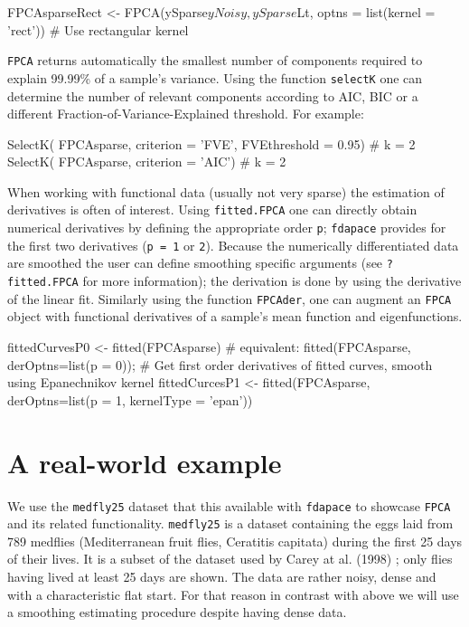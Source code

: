 \documentclass[11pt,english]{article}\usepackage[]{graphicx}\usepackage[]{color}
\begin{document}
\begin{Schunk}
\begin{Sinput}
 FPCAsparseRect <- FPCA(ySparse$yNoisy, ySparse$Lt, optns = list(kernel = 'rect')) # Use rectangular kernel
\end{Sinput}
\end{Schunk}

\texttt{FPCA} returns automatically the smallest number of components required to explain 99.99\% of a sample's variance. Using the function \texttt{selectK} one can determine the number of relevant components according to AIC, BIC or a different Fraction-of-Variance-Explained threshold. For example:
\begin{Schunk}
\begin{Sinput}
SelectK( FPCAsparse, criterion = 'FVE', FVEthreshold = 0.95) # k = 2
SelectK( FPCAsparse, criterion = 'AIC') # k = 2
\end{Sinput}
\end{Schunk}
When working with functional data (usually not very sparse) the estimation of derivatives is often of interest. Using \texttt{fitted.FPCA} one can directly obtain numerical derivatives by defining the appropriate order \texttt{p}; \texttt{fdapace} provides for the first two derivatives (\texttt{p = 1} or \texttt{2}). Because the numerically differentiated data are smoothed the user can define smoothing specific arguments (see \texttt{?fitted.FPCA} for more information); the derivation is done by using the derivative of the linear fit. Similarly using the function  \texttt{FPCAder}, one can augment an \texttt{FPCA} object with functional derivatives of a sample's mean function and eigenfunctions. 

\begin{Schunk}
\begin{Sinput}
fittedCurvesP0 <- fitted(FPCAsparse) # equivalent: fitted(FPCAsparse, derOptns=list(p = 0));
# Get first order derivatives of fitted curves, smooth using Epanechnikov kernel
fittedCurcesP1 <- fitted(FPCAsparse, derOptns=list(p = 1, kernelType = 'epan')) 
\end{Sinput}
\end{Schunk}

\section{A real-world example}

We use the \texttt{medfly25} dataset that this available with \texttt{fdapace} to showcase \texttt{FPCA} and its related functionality. \texttt{medfly25} is a dataset containing the eggs laid from 789 medflies (Mediterranean fruit flies, Ceratitis capitata) during the first 25 days of their lives. It is a subset of the dataset used by Carey at al. (1998) \cite{Carey98}; only flies having lived at least 25 days are shown. The data are rather noisy, dense and with a characteristic flat start. For that reason in contrast with above we will use a smoothing estimating procedure despite having dense data.   
\end{document}
